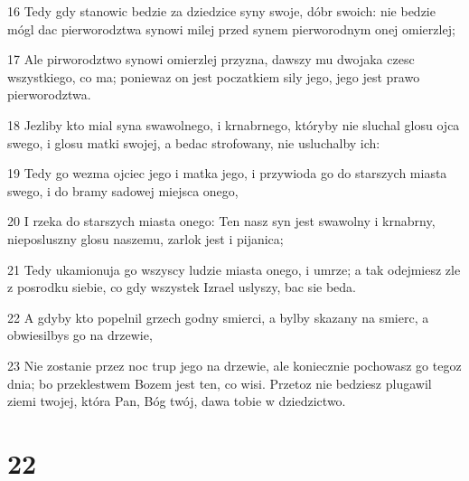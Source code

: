 \par 16 Tedy gdy stanowic bedzie za dziedzice syny swoje, dóbr swoich: nie bedzie mógl dac pierworodztwa synowi milej przed synem pierworodnym onej omierzlej;
\par 17 Ale pirworodztwo synowi omierzlej przyzna, dawszy mu dwojaka czesc wszystkiego, co ma; poniewaz on jest poczatkiem sily jego, jego jest prawo pierworodztwa.
\par 18 Jezliby kto mial syna swawolnego, i krnabrnego, któryby nie sluchal glosu ojca swego, i glosu matki swojej, a bedac strofowany, nie usluchalby ich:
\par 19 Tedy go wezma ojciec jego i matka jego, i przywioda go do starszych miasta swego, i do bramy sadowej miejsca onego,
\par 20 I rzeka do starszych miasta onego: Ten nasz syn jest swawolny i krnabrny, nieposluszny glosu naszemu, zarlok jest i pijanica;
\par 21 Tedy ukamionuja go wszyscy ludzie miasta onego, i umrze; a tak odejmiesz zle z posrodku siebie, co gdy wszystek Izrael uslyszy, bac sie beda.
\par 22 A gdyby kto popelnil grzech godny smierci, a bylby skazany na smierc, a obwiesilbys go na drzewie,
\par 23 Nie zostanie przez noc trup jego na drzewie, ale koniecznie pochowasz go tegoz dnia; bo przeklestwem Bozem jest ten, co wisi. Przetoz nie bedziesz plugawil ziemi twojej, która Pan, Bóg twój, dawa tobie w dziedzictwo.

\chapter{22}


